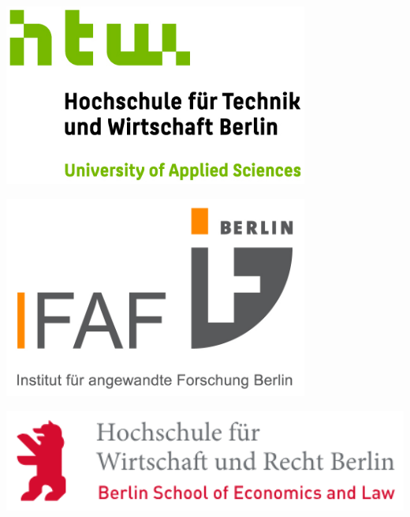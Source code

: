 \documentclass[a0,portrait]{a0poster}
\begin{document}
\begin{minipage}[b]{0.33\linewidth}
\includegraphics[width=10cm,left]{htw_logo.jpg}
\end{minipage}
\begin{minipage}[b]{0.34\linewidth}
\includegraphics[width=10cm,center]{ifaf_logo.jpg}
\end{minipage}
\begin{minipage}[b]{0.33\linewidth}
\includegraphics[width=15cm,right]{hwr_logo.png}
\end{minipage}
\end{document}
